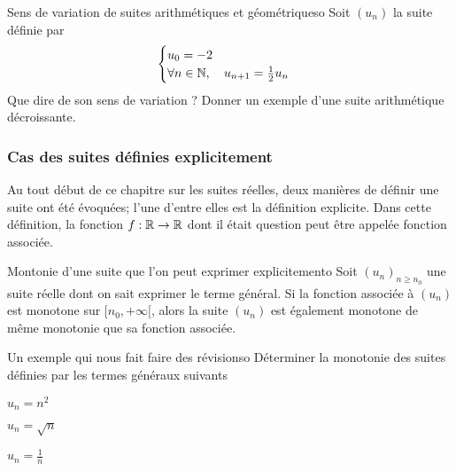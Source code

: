 \begin{exemple}{Sens de variation de suites arithmétiques et géométriques}{o}
	Soit $(u_n)$ la suite définie par \[\begin{cases}u_0=-2\\ \forall n\in\mathbb{N},\quad u_{n+1}=\frac12 u_n\end{cases}\]
	Que dire de son sens de variation ? Donner un exemple d'une suite arithmétique décroissante. 
\end{exemple}

\subsubsection{Cas des suites définies explicitement}
Au tout début de ce chapitre sur les suites réelles, deux manières de définir une suite ont été évoquées; l'une d'entre elles est la définition explicite. Dans cette définition, la fonction $f:\mathbb{R}\to\mathbb{R}$ dont il était question peut être appelée fonction associée.
\begin{proposition}{Montonie d'une suite que l'on peut exprimer explicitement}{o}
	Soit $(u_n)_{n\geq n_0}$ une suite réelle dont on sait exprimer le terme général. Si la fonction associée à $(u_n)$ est monotone sur $[n_0,+\infty[$, alors la suite $(u_n)$ est également monotone de même monotonie que sa fonction associée.
\end{proposition}

\begin{exemple}{Un exemple qui nous fait faire des révisions}{o}
	Déterminer la monotonie des suites définies par les termes généraux suivants
	\begin{enumerate}
		\begin{minipage}{0.4\linewidth}
		    \item $u_n=n^2$
		\end{minipage}
		\begin{minipage}{0.4\linewidth}
		    \item $u_n=\sqrt{n}$
		\end{minipage}
		\begin{minipage}{0.4\linewidth}
		    \item $u_n=\frac1n$
		\end{minipage}
	\end{enumerate}
\end{exemple}

